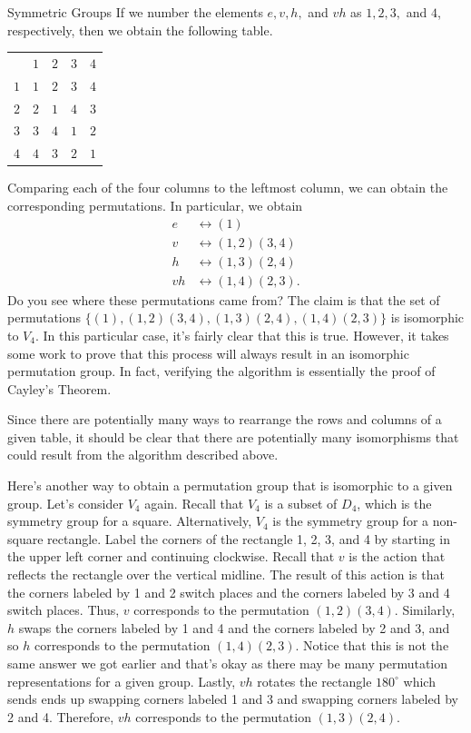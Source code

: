 \begin{section}{Symmetric Groups}
If we number the elements $e,v,h,$ and $vh$ as $1,2,3,$ and $4$, respectively, then we obtain the following table.

\begin{center}
\begin{tabular}{c!{\vrule width 2pt}c|c|c|c}
 & $1$ & $2$ & $3$ & $4$ \\ 
$1$ & $1$ & $2$ & $3$ & $4$ \\
\hline $2$ & $2$ & $1$ & $4$ & $3$  \\
\hline $3$ & $3$ & $4$ & $1$ & $2$\\
\hline $4$ & $4$ & $3$ & $2$ & $1$
\end{tabular}
\end{center}

\noindent Comparing each of the four columns to the leftmost column, we can obtain the corresponding permutations.  In particular, we obtain
\begin{align*}
e&\leftrightarrow (1)\\
v&\leftrightarrow (1,2)(3,4)\\
h&\leftrightarrow (1,3)(2,4)\\
vh&\leftrightarrow(1,4)(2,3). 
\end{align*}
Do you see where these permutations came from?  The claim is that the set of permutations $\{(1),(1,2)(3,4),(1,3)(2,4),(1,4)(2,3)\}$ is isomorphic to $V_4$.  In this particular case, it's fairly clear that this is true.  However, it takes some work to prove that this process will always result in an isomorphic permutation group.  In fact, verifying the algorithm is essentially the proof of Cayley's Theorem. 

Since there are potentially many ways to rearrange the rows and columns of a given table, it should be clear that there are potentially many isomorphisms that could result from the algorithm described above.

Here's another way to obtain a permutation group that is isomorphic to a given group.  Let's consider $V_4$ again.  Recall that $V_4$ is a subset of $D_4$, which is the symmetry group for a square.  Alternatively, $V_4$ is the symmetry group for a non-square rectangle.  Label the corners of the rectangle 1, 2, 3, and 4 by starting in the upper left corner and continuing clockwise.  Recall that $v$ is the action that reflects the rectangle over the vertical midline.  The result of this action is that the corners labeled by 1 and 2 switch places and the corners labeled by 3 and 4 switch places.  Thus, $v$ corresponds to the permutation $(1,2)(3,4)$.  Similarly, $h$ swaps the corners labeled by 1 and 4 and the corners labeled by 2 and 3, and so $h$ corresponds to the permutation $(1,4)(2,3)$.  Notice that this is not the same answer we got earlier and that's okay as there may be many permutation representations for a given group.  Lastly, $vh$ rotates the rectangle $180^{\circ}$ which sends ends up swapping corners labeled 1 and 3 and swapping corners labeled by 2 and 4.  Therefore, $vh$ corresponds to the permutation $(1,3)(2,4)$.


\end{section}

